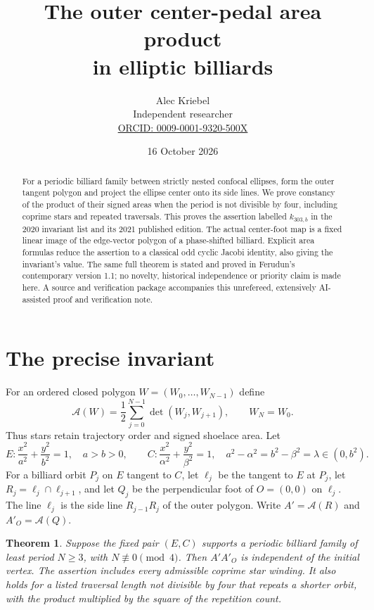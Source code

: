 \documentclass[11pt]{article}
\title{The outer center-pedal area product\\in elliptic billiards}
\author{Alec Kriebel\\Independent researcher\\\small\href{https://orcid.org/0009-0001-9320-500X}{ORCID: 0009-0001-9320-500X}}
\date{16 October 2026}
\newtheorem{theorem}{Theorem}
\newcommand{\Area}{\mathcal A}
\begin{document}
\maketitle
\begin{abstract}
For a periodic billiard family between strictly nested confocal ellipses,
form the outer tangent polygon and project the ellipse center onto its side
lines. We prove constancy of the product of their signed areas when the
period is not divisible by four, including coprime stars and repeated
traversals. This proves the assertion labelled $k_{303,b}$ in the 2020
invariant list and its 2021 published edition. The actual center-foot map
is a fixed linear image of the edge-vector polygon of a phase-shifted
billiard. Explicit area formulas reduce the assertion to a classical odd
cyclic Jacobi identity, also giving the invariant's value. The same full
theorem is stated and proved in Ferudun's contemporary version 1.1; no
novelty, historical independence or priority claim is made here. A source
and verification package accompanies this unrefereed, extensively AI-assisted
proof and verification note.
\end{abstract}

\section{The precise invariant}
For an ordered closed polygon $W=(W_0,\ldots,W_{N-1})$ define
\begin{equation}\label{eq:area}
 \Area(W)=\frac12\sum_{j=0}^{N-1}\det(W_j,W_{j+1}),\qquad W_N=W_0.
\end{equation}
Thus stars retain trajectory order and signed shoelace area. Let
\[
 E:\frac{x^2}{a^2}+\frac{y^2}{b^2}=1,\quad a>b>0,\qquad
 C:\frac{x^2}{\alpha^2}+\frac{y^2}{\beta^2}=1,
 \quad a^2-\alpha^2=b^2-\beta^2=\lambda\in(0,b^2).
\]
For a billiard orbit $P_j$ on $E$ tangent to $C$, let $\ell_j$ be the
tangent to $E$ at $P_j$, let $R_j=\ell_j\cap\ell_{j+1}$, and let $Q_j$
be the perpendicular foot of $O=(0,0)$ on $\ell_j$. The line $\ell_j$
is the side line $R_{j-1}R_j$ of the outer polygon. Write
$A'=\Area(R)$ and $A'_O=\Area(Q)$.

\begin{theorem}\label{thm:main}
Suppose the fixed pair $(E,C)$ supports a periodic billiard family of least
period $N\geq3$, with $N\not\equiv0\pmod4$. Then $A'A'_O$ is independent
of the initial vertex. The assertion includes every admissible coprime star
winding. It also holds for a listed traversal length not divisible by four
that repeats a shorter orbit, with the product multiplied by the square
of the repetition count.
\end{theorem}
\end{document}
